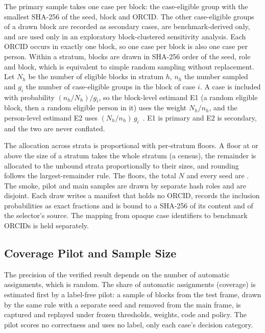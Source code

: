 The primary sample takes one case per block: the case-eligible group with the smallest SHA-256 of the seed, block and ORCID. The other case-eligible groups of a drawn block are recorded as secondary cases, are benchmark-derived only, and are used only in an exploratory block-clustered sensitivity analysis. Each ORCID occurs in exactly one block, so one case per block is also one case per person. Within a stratum, blocks are drawn in SHA-256 order of the seed, role and block, which is equivalent to simple random sampling without replacement. Let $N_h$ be the number of eligible blocks in stratum $h$, $n_h$ the number sampled and $g_i$ the number of case-eligible groups in the block of case $i$. A case is included with probability $(n_h/N_h)/g_i$, so the block-level estimand E1 (a random eligible block, then a random eligible person in it) uses the weight $N_h/n_h$, and the person-level estimand E2 uses $(N_h/n_h)\,g_i$~\cite{horvitz1952}. E1 is primary and E2 is secondary, and the two are never conflated.

The allocation across strata is proportional with per-stratum floors. A floor at or above the size of a stratum takes the whole stratum (a census), the remainder is allocated to the unbound strata proportionally to their sizes, and rounding follows the largest-remainder rule. The floors, the total $N$ and every seed are . The smoke, pilot and main samples are drawn by separate hash roles and are disjoint. Each draw writes a manifest that holds no ORCID, records the inclusion probabilities as exact fractions and is bound to a SHA-256 of its content and of the selector's source. The mapping from opaque case identifiers to benchmark ORCIDs is held separately.

\subsection{Coverage Pilot and Sample Size}
\label{sec:pilot}
The precision of the verified result depends on the number of automatic assignments, which is random. The share of automatic assignments (coverage) is estimated first by a label-free pilot: a sample of blocks from the test frame, drawn by the same rule with a separate seed and removed from the main frame, is captured and replayed under frozen thresholds, weights, code and policy. The pilot scores no correctness and uses no label, only each case's decision category.

